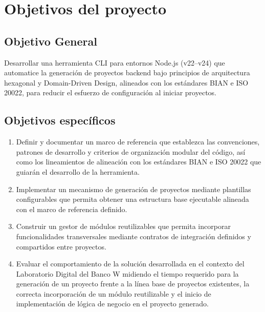 
\section{Objetivos del proyecto}

\subsection{Objetivo General}
Desarrollar una herramienta CLI para entornos Node.js (v22–v24) que automatice la generación de proyectos backend bajo principios de arquitectura hexagonal y Domain-Driven Design, alineados con los estándares BIAN e ISO 20022, para reducir el esfuerzo de configuración al iniciar proyectos.

\subsection{Objetivos específicos}
\begin{enumerate}
\item Definir y documentar un marco de referencia que establezca las convenciones, patrones de desarrollo y criterios de organización modular del código, así como los lineamientos de alineación con los estándares BIAN e ISO 20022 que guiarán el desarrollo de la herramienta.

\item Implementar un mecanismo de generación de proyectos mediante plantillas configurables que permita obtener una estructura base ejecutable alineada con el marco de referencia definido.

\item Construir un gestor de módulos reutilizables que permita incorporar funcionalidades transversales mediante contratos de integración definidos y compartidos entre proyectos.

\item Evaluar el comportamiento de la solución desarrollada en el contexto del Laboratorio Digital del Banco W midiendo el tiempo requerido para la generación de un proyecto frente a la línea base de proyectos existentes, la correcta incorporación de un módulo reutilizable y el inicio de implementación de lógica de negocio en el proyecto generado.

\end{enumerate}
